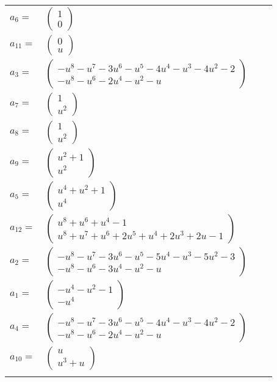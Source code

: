 \documentclass[1p]{elsarticle_modified}
\theoremstyle{definition}
\begin{document}
\begin{tabular}{m{7pt} m{180pt} m{7pt} m{180pt} }
\flushright $a_{6}=$&$\begin{pmatrix}1\\0\end{pmatrix}$ \\
\flushright $a_{11}=$&$\begin{pmatrix}0\\u\end{pmatrix}$ \\
\flushright $a_{3}=$&$\begin{pmatrix}- u^8- u^7-3 u^6- u^5-4 u^4- u^3-4 u^2-2\\- u^8- u^6-2 u^4- u^2- u\end{pmatrix}$ \\
\flushright $a_{7}=$&$\begin{pmatrix}1\\u^2\end{pmatrix}$ \\
\flushright $a_{8}=$&$\begin{pmatrix}1\\u^2\end{pmatrix}$ \\
\flushright $a_{9}=$&$\begin{pmatrix}u^2+1\\u^2\end{pmatrix}$ \\
\flushright $a_{5}=$&$\begin{pmatrix}u^4+u^2+1\\u^4\end{pmatrix}$ \\
\flushright $a_{12}=$&$\begin{pmatrix}u^8+u^6+u^4-1\\u^8+u^7+u^6+2 u^5+u^4+2 u^3+2 u-1\end{pmatrix}$ \\
\flushright $a_{2}=$&$\begin{pmatrix}- u^8- u^7-3 u^6- u^5-5 u^4- u^3-5 u^2-3\\- u^8- u^6-3 u^4- u^2- u\end{pmatrix}$ \\
\flushright $a_{1}=$&$\begin{pmatrix}- u^4- u^2-1\\- u^4\end{pmatrix}$ \\
\flushright $a_{4}=$&$\begin{pmatrix}- u^8- u^7-3 u^6- u^5-4 u^4- u^3-4 u^2-2\\- u^8- u^6-2 u^4- u^2- u\end{pmatrix}$ \\
\flushright $a_{10}=$&$\begin{pmatrix}u\\u^3+u\end{pmatrix}$\\&\end{tabular}
\end{document}
